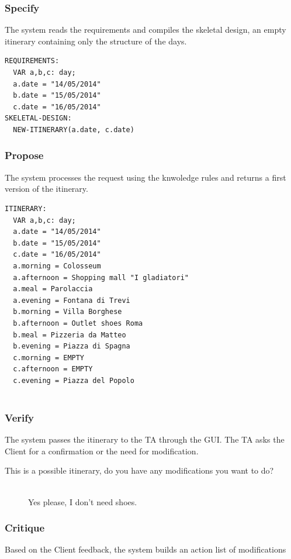 \documentclass[11pt]{article} %
\begin{document}
\subsubsection{Specify}
The system reads the requirements and compiles the skeletal design, an empty itinerary containing only the structure of the days.

\begin{lstlisting}[breaklines=true,mathescape=true]
REQUIREMENTS:
  VAR a,b,c: day;
  a.date = "14/05/2014"
  b.date = "15/05/2014"
  c.date = "16/05/2014"
SKELETAL-DESIGN:
  NEW-ITINERARY(a.date, c.date)
\end{lstlisting}

\subsubsection{Propose}
The system processes the request using the knwoledge rules and returns a first version of the itinerary.

\begin{lstlisting}[breaklines=true,mathescape=true]
ITINERARY:
  VAR a,b,c: day;
  a.date = "14/05/2014"
  b.date = "15/05/2014"
  c.date = "16/05/2014"
  a.morning = Colosseum
  a.afternoon = Shopping mall "I gladiatori"
  a.meal = Parolaccia
  a.evening = Fontana di Trevi
  b.morning = Villa Borghese
  b.afternoon = Outlet shoes Roma
  b.meal = Pizzeria da Matteo
  b.evening = Piazza di Spagna
  c.morning = EMPTY
  c.afternoon = EMPTY 
  c.evening = Piazza del Popolo
  
\end{lstlisting}

\subsubsection{Verify}
The system passes the itinerary to the TA through the GUI. The TA asks the Client for a confirmation or the need for modification.

\begin{description}
  \item[This is a possible itinerary, do you have any modifications you want to do?] \hfill \\
  Yes please, I don't need shoes.
\end{description}

\subsubsection{Critique}
Based on the Client feedback, the system builds an action list of modifications
\end{document}
